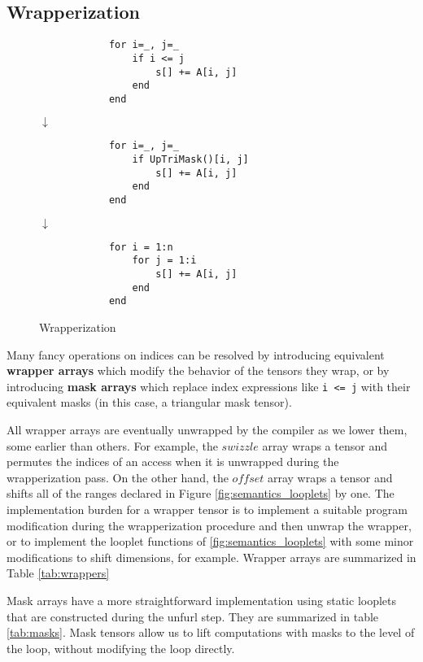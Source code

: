 \subsection{Wrapperization}
    \begin{wrapfigure}{R}{0.21\textwidth}
        \vspace{-1\intextsep}
        \begin{verbatim}
            for i=_, j=_
                if i <= j
                    s[] += A[i, j]
                end
            end
        \end{verbatim}
        $\downarrow$
        \begin{verbatim}
            for i=_, j=_
                if UpTriMask()[i, j]
                    s[] += A[i, j]
                end
            end
        \end{verbatim}
        $\downarrow$
        \begin{verbatim}
            for i = 1:n
                for j = 1:i
                    s[] += A[i, j]
                end
            end
        \end{verbatim}
        \caption{Wrapperization}\label{fig:wrapperization}
    \end{wrapfigure}

    Many fancy operations on indices can be resolved by introducing equivalent
    \textbf{wrapper arrays} which modify the behavior of the tensors they wrap,
    or by introducing \textbf{mask arrays} which replace index expressions like
    \texttt{i <= j} with their equivalent masks (in this case, a
    triangular mask tensor).

    All wrapper arrays are eventually unwrapped by the compiler as we lower
    them, some earlier than others. For example, the $swizzle$ array wraps a
    tensor and permutes the indices of an access when it is unwrapped during the
    wrapperization pass. On the other hand, the $offset$ array wraps a tensor
    and shifts all of the ranges declared in Figure \ref{fig:semantics_looplets} by one.
    The implementation burden for a wrapper tensor is to implement a suitable
    program modification during the wrapperization procedure and then unwrap the wrapper, or to 
    implement the looplet functions of \ref{fig:semantics_looplets} with some minor modifications
    to shift dimensions, for example. Wrapper arrays are summarized in Table \ref{tab:wrappers}

    Mask arrays have a more straightforward implementation using static looplets
    that are constructed during the unfurl step. They are summarized in table \ref{tab:masks}. Mask tensors
    allow us to lift computations with masks to the level of the loop, without modifying the loop directly.


